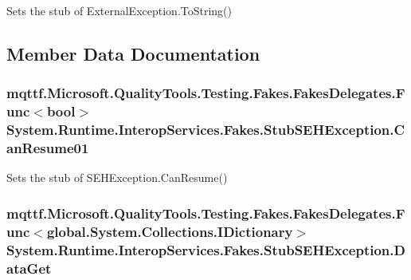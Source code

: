 Sets the stub of External\-Exception.\-To\-String()



\subsection{Member Data Documentation}
\hypertarget{class_system_1_1_runtime_1_1_interop_services_1_1_fakes_1_1_stub_s_e_h_exception_a0d1f2b2a3ee86150222118c2878a7c62}{
\subsubsection[{Can\-Resume01}]{\setlength{\rightskip}{0pt plus 5cm}mqttf.\-Microsoft.\-Quality\-Tools.\-Testing.\-Fakes.\-Fakes\-Delegates.\-Func$<$bool$>$ System.\-Runtime.\-Interop\-Services.\-Fakes.\-Stub\-S\-E\-H\-Exception.\-Can\-Resume01}}\label{class_system_1_1_runtime_1_1_interop_services_1_1_fakes_1_1_stub_s_e_h_exception_a0d1f2b2a3ee86150222118c2878a7c62}


Sets the stub of S\-E\-H\-Exception.\-Can\-Resume()

\hypertarget{class_system_1_1_runtime_1_1_interop_services_1_1_fakes_1_1_stub_s_e_h_exception_ae216ee3b6002d3a7740d9c83e33d82bf}{
\subsubsection[{Data\-Get}]{\setlength{\rightskip}{0pt plus 5cm}mqttf.\-Microsoft.\-Quality\-Tools.\-Testing.\-Fakes.\-Fakes\-Delegates.\-Func$<$global.\-System.\-Collections.\-I\-Dictionary$>$ System.\-Runtime.\-Interop\-Services.\-Fakes.\-Stub\-S\-E\-H\-Exception.\-Data\-Get}}\label{class_system_1_1_runtime_1_1_interop_services_1_1_fakes_1_1_stub_s_e_h_exception_ae216ee3b6002d3a7740d9c83e33d82bf}


